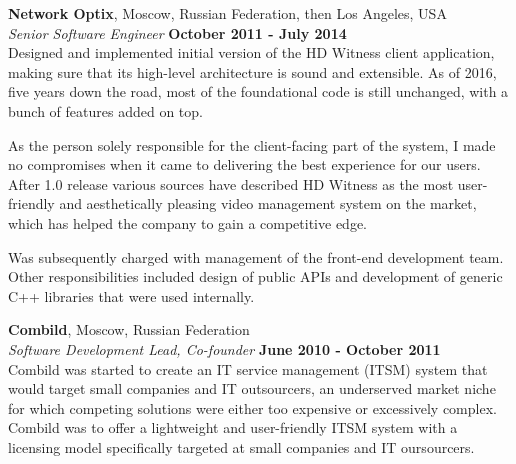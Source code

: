 \documentclass[margin,line]{CV}
\begin{document}
\begin{resume}
    
    
    \textbf{Network Optix}, Moscow, Russian Federation, then Los Angeles, USA \vspace{2mm}\\\vspace{1mm}%
    \textsl{Senior Software Engineer} \hfill \textbf{October 2011 - July 2014}\\ 
    Designed and implemented initial version of the HD Witness client application, making sure that its high-level architecture is sound and extensible. As of 2016, five years down the road, most of the foundational code is still unchanged, with a bunch of features added on top.
    
    As the person solely responsible for the client-facing part of the system, I made no compromises when it came to delivering the best experience for our users. After 1.0 release various sources have described HD Witness as the most user-friendly and aesthetically pleasing video management system on the market, which has helped the company to gain a competitive edge.
    
    Was subsequently charged with management of the front-end development team. Other responsibilities included design of public APIs and development of generic C++ libraries that were used internally.
    
    

    
    \pagebreak    

    
    \textbf{Combild}, Moscow, Russian Federation \vspace{2mm}\\\vspace{1mm}%
    \textsl{Software Development Lead, Co-founder} \hfill \textbf{June 2010 - October 2011}\\
    Combild was started to create an IT service management (ITSM) system that would target small companies and IT outsourcers, an underserved market niche for which competing solutions were either too expensive or excessively complex. Combild was to offer a lightweight and user-friendly ITSM system with a licensing model specifically targeted at small companies and IT oursourcers.


\end{resume}
\end{document}
